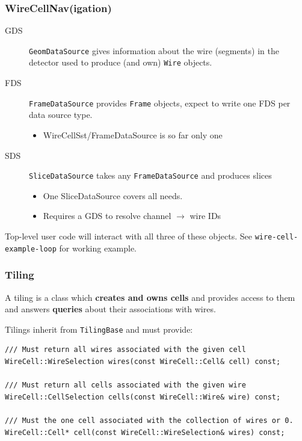 \documentclass[xcolor=dvipsnames]{beamer}
\begin{document}
\begin{frame}
  \frametitle{WireCellNav(igation)}
  \begin{description}
  \item[GDS] \texttt{GeomDataSource} gives information about the wire (segments) in the
    detector used to produce (and own) \texttt{Wire} objects.
  \item[FDS] \texttt{FrameDataSource} provides \texttt{Frame} objects, expect to
    write one FDS per data source type.
    \begin{itemize}
    \item WireCellSst/FrameDataSource is so far only one
    \end{itemize}
  \item[SDS] \texttt{SliceDataSource} takes any \texttt{FrameDataSource} and
    produces slices
    \begin{itemize}
    \item One SliceDataSource covers all needs.
    \item Requires a GDS to resolve channel $\rightarrow$ wire IDs
    \end{itemize}
  \end{description}
  Top-level user code will interact with all three of these objects.
  See \texttt{wire-cell-example-loop} for working example.
\end{frame}

\begin{frame}[fragile]
  \frametitle{Tiling}

  A tiling is a class which \textbf{creates and owns cells} and provides access to
  them and answers \textbf{queries} about their associations with wires.

  \vspace{2mm}

  Tilings inherit from \texttt{TilingBase} and must provide:

  \begin{lstlisting}
/// Must return all wires associated with the given cell
WireCell::WireSelection wires(const WireCell::Cell& cell) const;
        
/// Must return all cells associated with the given wire
WireCell::CellSelection cells(const WireCell::Wire& wire) const;

/// Must the one cell associated with the collection of wires or 0.
WireCell::Cell* cell(const WireCell::WireSelection& wires) const;
  \end{lstlisting}

\end{frame}
\end{document}
